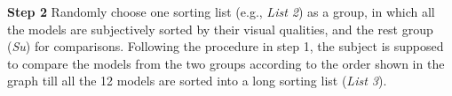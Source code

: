 \textbf{Step 2} Randomly choose one sorting list (e.g., \textit{List 2}) as a group, in which all the models are subjectively sorted by their visual qualities, and the rest group (\textit{Su})  for comparisons. Following the procedure in step 1, the subject is supposed to compare the models from the two groups according to the order shown in the graph till all the 12 models are sorted into a long sorting list (\textit{List 3}).
